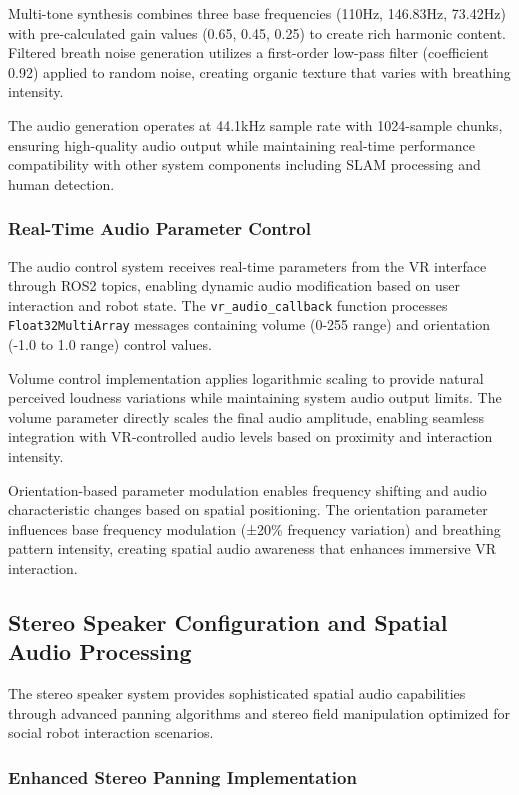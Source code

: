 Multi-tone synthesis combines three base frequencies (110Hz, 146.83Hz, 73.42Hz) with pre-calculated gain values (0.65, 0.45, 0.25) to create rich harmonic content. Filtered breath noise generation utilizes a first-order low-pass filter (coefficient 0.92) applied to random noise, creating organic texture that varies with breathing intensity.

The audio generation operates at 44.1kHz sample rate with 1024-sample chunks, ensuring high-quality audio output while maintaining real-time performance compatibility with other system components including SLAM processing and human detection.

\subsubsection{Real-Time Audio Parameter Control}

The audio control system receives real-time parameters from the VR interface through ROS2 topics, enabling dynamic audio modification based on user interaction and robot state. The \texttt{vr\_audio\_callback} function processes \texttt{Float32MultiArray} messages containing volume (0-255 range) and orientation (-1.0 to 1.0 range) control values.

Volume control implementation applies logarithmic scaling to provide natural perceived loudness variations while maintaining system audio output limits. The volume parameter directly scales the final audio amplitude, enabling seamless integration with VR-controlled audio levels based on proximity and interaction intensity.

Orientation-based parameter modulation enables frequency shifting and audio characteristic changes based on spatial positioning. The orientation parameter influences base frequency modulation (±20\% frequency variation) and breathing pattern intensity, creating spatial audio awareness that enhances immersive VR interaction.

\subsection{Stereo Speaker Configuration and Spatial Audio Processing}

The stereo speaker system provides sophisticated spatial audio capabilities through advanced panning algorithms and stereo field manipulation optimized for social robot interaction scenarios.

\subsubsection{Enhanced Stereo Panning Implementation}

